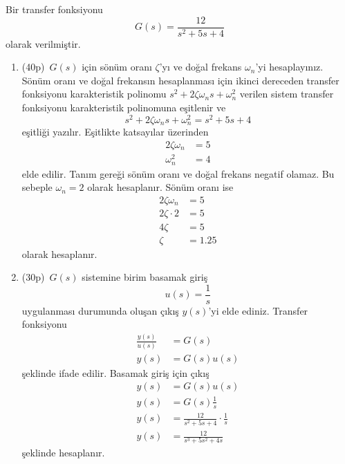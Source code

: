 Bir transfer fonksiyonu
\begin{equation}
    G(s)=\frac{12}{s^2+5s+4}
\end{equation}
olarak verilmiştir.
\begin{enumerate}
    \item(40p)\, $G(s)$ için sönüm oranı $\zeta$'yı ve doğal frekans $\omega_n$'yi hesaplayınız.
    Sönüm oranı ve doğal frekansın hesaplanması için ikinci dereceden transfer fonksiyonu karakteristik polinomu $s^2+2\zeta\omega_ns+\omega_n^2$ verilen sistem transfer fonksiyonu karakteristik polinomuna eşitlenir ve 
    \begin{equation}
        s^2+2\zeta\omega_ns+\omega_n^2=s^2+5s+4
    \end{equation}
    eşitliği yazılır. Eşitlikte katsayılar üzerinden
    \begin{equation}
        \begin{split}
            2\zeta\omega_n&=5\\
            \omega_n^2&=4
        \end{split}
    \end{equation}
    elde edilir. Tanım gereği sönüm oranı ve doğal frekans negatif olamaz. Bu sebeple $\omega_n=2$ olarak hesaplanır. Sönüm oranı ise
    \begin{equation}
        \begin{split}
            2\zeta\omega_n&=5\\
            2\zeta\cdot 2&=5\\
            4\zeta&=5\\
            \zeta&=1.25
        \end{split}
    \end{equation}
    olarak hesaplanır. 

    \item(30p)\, $G(s)$ sistemine birim basamak giriş
    \begin{equation}
        u(s)=\frac{1}{s}
    \end{equation}
    uygulanması durumunda oluşan çıkış $y(s)$'yi elde ediniz. Transfer fonksiyonu
    \begin{equation}
    \begin{split}
        \frac{y(s)}{u(s)}&=G(s)\\
        y(s)&=G(s)u(s)
    \end{split}
    \end{equation}
    şeklinde ifade edilir. Basamak giriş için çıkış
    \begin{equation}
    \begin{split}
        y(s)&=G(s)u(s)\\
        y(s)&=G(s)\frac{1}{s}\\
        y(s)&=\frac{12}{s^2+5s+4}\cdot \frac{1}{s}\\
        y(s)&=\frac{12}{s^3+5s^2+4s}
    \end{split}
    \end{equation}
    şeklinde hesaplanır. 
    

\end{enumerate}
